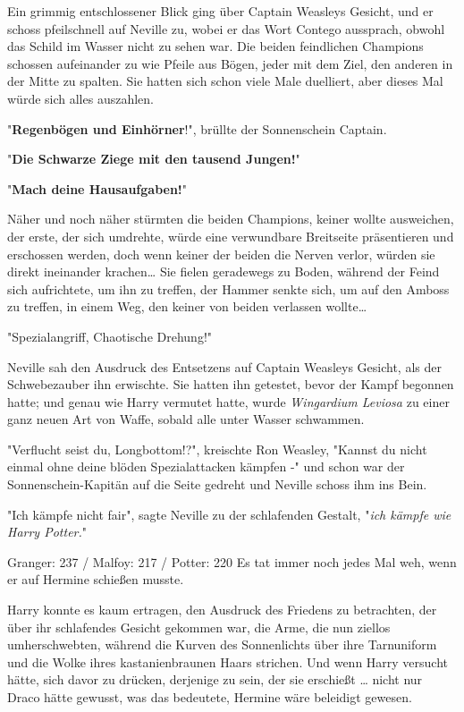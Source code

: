 {Ein grimmig entschlossener Blick ging über Captain Weasleys Gesicht, und er schoss pfeilschnell auf Neville zu, wobei er das Wort Contego aussprach, obwohl das Schild im Wasser nicht zu sehen war. Die beiden feindlichen Champions schossen aufeinander zu wie Pfeile aus Bögen, jeder mit dem Ziel, den anderen in der Mitte zu spalten. Sie hatten sich schon viele Male duelliert, aber dieses Mal würde sich alles auszahlen.

"\textbf{Regenbögen und Einhörner}!", brüllte der Sonnenschein Captain.

"\textbf{Die Schwarze Ziege mit den tausend Jungen!}"

"\textbf{Mach deine Hausaufgaben!}"

Näher und noch näher stürmten die beiden Champions, keiner wollte ausweichen, der erste, der sich umdrehte, würde eine verwundbare Breitseite präsentieren und erschossen werden, doch wenn keiner der beiden die Nerven verlor, würden sie direkt ineinander krachen… Sie fielen geradewegs zu Boden, während der Feind sich aufrichtete, um ihn zu treffen, der Hammer senkte sich, um auf den Amboss zu treffen, in einem Weg, den keiner von beiden verlassen wollte…

"Spezialangriff, Chaotische Drehung!"

Neville sah den Ausdruck des Entsetzens auf Captain Weasleys Gesicht, als der Schwebezauber ihn erwischte. Sie hatten ihn getestet, bevor der Kampf begonnen hatte; und genau wie Harry vermutet hatte, wurde \emph{Wingardium Leviosa} zu einer ganz neuen Art von Waffe, sobald alle unter Wasser schwammen.

"Verflucht seist du, Longbottom!?", kreischte Ron Weasley, "Kannst du nicht einmal ohne deine blöden Spezialattacken kämpfen -" und schon war der Sonnenschein-Kapitän auf die Seite gedreht und Neville schoss ihm ins Bein.

"Ich kämpfe nicht fair", sagte Neville zu der schlafenden Gestalt, "\emph{ich kämpfe wie Harry Potter.}"

Granger: 237 / Malfoy: 217 / Potter: 220 Es tat immer noch jedes Mal weh, wenn er auf Hermine schießen musste.

Harry konnte es kaum ertragen, den Ausdruck des Friedens zu betrachten, der über ihr schlafendes Gesicht gekommen war, die Arme, die nun ziellos umherschwebten, während die Kurven des Sonnenlichts über ihre Tarnuniform und die Wolke ihres kastanienbraunen Haars strichen. Und wenn Harry versucht hätte, sich davor zu drücken, derjenige zu sein, der sie erschießt … nicht nur Draco hätte gewusst, was das bedeutete, Hermine wäre beleidigt gewesen.

}
